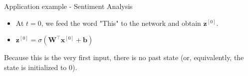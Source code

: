 \documentclass[11pt,compress,t,notes=noshow]{beamer}
\begin{document}
\begin{frame} {Application example - Sentiment Analysis}
  \begin{itemize}
    \item At $t = 0$, we feed the word "This" to the network and obtain $\bm{z}^{[0]}$.
    \item $\bm{z}^{[0]} = \sigma(\bm{W}^\top \bm{x}^{[0]} + \bm{b})$
  \end{itemize}
  \begin{figure}
      \centering
  \end{figure}
  Because this is the very first input, there is no past state (or, equivalently, the state is initialized to 0).
\end{frame}
\end{document}
